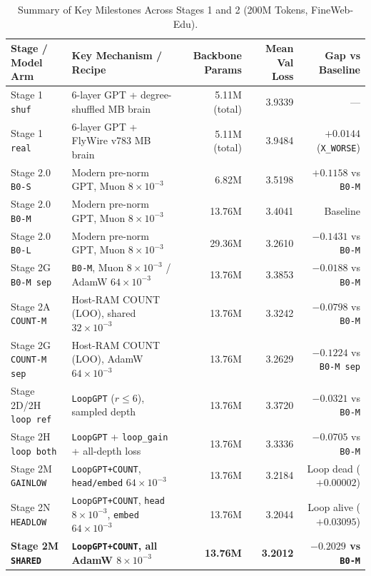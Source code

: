\documentclass[11pt,a4paper]{article}
\begin{document}
\begin{table}[htbp]
\centering
\small
\caption{Summary of Key Milestones Across Stages 1 and 2 (200M Tokens, FineWeb-Edu).}
\label{tab:summary}
\begin{tabular}{llrrr}
\toprule
\textbf{Stage / Model Arm} & \textbf{Key Mechanism / Recipe} & \textbf{Backbone Params} & \textbf{Mean Val Loss} & \textbf{Gap vs Baseline} \\
\midrule
Stage 1 \texttt{shuf} & 6-layer GPT + degree-shuffled MB brain & 5.11M (total) & 3.9339 & --- \\
Stage 1 \texttt{real} & 6-layer GPT + FlyWire v783 MB brain & 5.11M (total) & 3.9484 & $+0.0144$ (\texttt{X\_WORSE}) \\
\midrule
Stage 2.0 \texttt{B0-S} & Modern pre-norm GPT, Muon $8\times 10^{-3}$ & 6.82M & 3.5198 & $+0.1158$ vs \texttt{B0-M} \\
Stage 2.0 \texttt{B0-M} & Modern pre-norm GPT, Muon $8\times 10^{-3}$ & 13.76M & 3.4041 & Baseline \\
Stage 2.0 \texttt{B0-L} & Modern pre-norm GPT, Muon $8\times 10^{-3}$ & 29.36M & 3.2610 & $-0.1431$ vs \texttt{B0-M} \\
\midrule
Stage 2G \texttt{B0-M sep} & \texttt{B0-M}, Muon $8\times 10^{-3}$ / AdamW $64\times 10^{-3}$ & 13.76M & 3.3853 & $-0.0188$ vs \texttt{B0-M} \\
Stage 2A \texttt{COUNT-M} & Host-RAM COUNT (LOO), shared $32\times 10^{-3}$ & 13.76M & 3.3242 & $-0.0798$ vs \texttt{B0-M} \\
Stage 2G \texttt{COUNT-M sep} & Host-RAM COUNT (LOO), AdamW $64\times 10^{-3}$ & 13.76M & 3.2629 & $-0.1224$ vs \texttt{B0-M sep} \\
\midrule
Stage 2D/2H \texttt{loop ref} & \texttt{LoopGPT} ($r\le 6$), sampled depth & 13.76M & 3.3720 & $-0.0321$ vs \texttt{B0-M} \\
Stage 2H \texttt{loop both} & \texttt{LoopGPT} + \texttt{loop\_gain} + all-depth loss & 13.76M & 3.3336 & $-0.0705$ vs \texttt{B0-M} \\
Stage 2M \texttt{GAINLOW} & \texttt{LoopGPT+COUNT}, \texttt{head/embed} $64\times 10^{-3}$ & 13.76M & 3.2184 & Loop dead ($+0.00002$) \\
Stage 2N \texttt{HEADLOW} & \texttt{LoopGPT+COUNT}, \texttt{head} $8\times 10^{-3}$, \texttt{embed} $64\times 10^{-3}$ & 13.76M & 3.2044 & Loop alive ($+0.03095$) \\
\textbf{Stage 2M \texttt{SHARED}} & \textbf{\texttt{LoopGPT+COUNT}, all AdamW $8\times 10^{-3}$} & \textbf{13.76M} & \textbf{3.2012} & \textbf{$-0.2029$ vs \texttt{B0-M}} \\
\bottomrule
\end{tabular}
\end{table}
\end{document}
